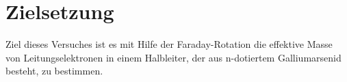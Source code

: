 \section{Zielsetzung}
\label{sec:zielsetzung}
Ziel dieses Versuches ist es mit Hilfe der Faraday-Rotation die effektive Masse von Leitungselektronen in einem Halbleiter, der aus n-dotiertem Galliumarsenid besteht, zu bestimmen.
